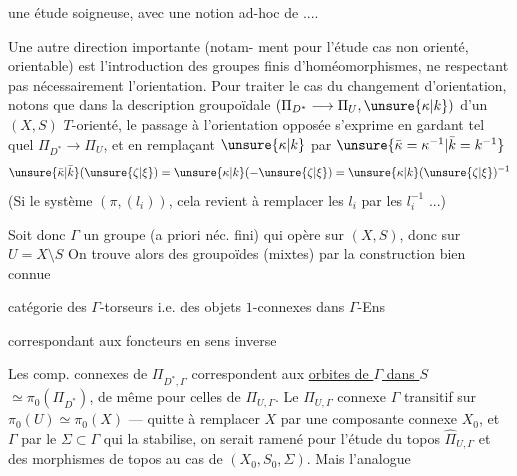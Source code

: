 une étude soigneuse, avec une notion
ad-hoc de  ....

Une autre direction importante (notam-
ment pour l'étude  cas non orienté,
 orientable) est l'introduction des
groupes finis d'homéomorphismes, ne
respectant pas nécessairement l'orientation.
Pour traiter le cas du changement d'orientation,
notons que dans la description groupoïdale
$(\Pi_{D^*}\longrightarrow\Pi_U,\unsure{\kappa|k})$ d'un $(X,S)$ $T$-orienté,
le passage à l'orientation opposée s'exprime en
gardant tel quel $\Pi_{D^*}\longrightarrow\Pi_U$, et en
remplaçant $\unsure{\kappa|k}$ par $\unsure{\bar\kappa=\kappa^{-1}|\bar k=k^{-1}}$
\[
\unsure{\bar\kappa|\bar k}(\unsure{\zeta|\xi})=\unsure{\kappa|k}(-\unsure{\zeta|\xi})=\unsure{\kappa|k}(\unsure{\zeta|\xi})^{-1}
\]
(Si  le système $(\pi,(l_i))$, cela revient à
remplacer les $l_i$ par les $l_i^{-1}$ ...)

Soit donc $\Gamma$ un groupe (a priori
 néc. fini) qui opère sur $(X,S)$, donc
sur $U=X\setminus S$  On trouve alors des
groupoïdes  (mixtes)  par la construction bien connue

catégorie des $\Gamma$-torseurs
i.e. des objets $1$-connexes
dans $\Gamma$-Ens

correspondant aux foncteurs en sens inverse


Les comp. connexes de $\Pi_{D^*,\Gamma}$ correspondent
aux \uline{orbites de $\Gamma$ dans $S$}  $\simeq\pi_0(\Pi_{D^*})$,
de même pour celles de $\Pi_{U,\Gamma}$. Le 
$\Pi_{U,\Gamma}$ connexe 
 $\Gamma$ transitif
sur $\pi_0(U)\simeq\pi_0(X)$ --- quitte à remplacer
$X$ par une composante connexe $X_0$, et $\Gamma$
par le  $\Sigma\subset\Gamma$ qui la stabilise,
on serait ramené pour l'étude du
topos $\widehat\Pi_{U,\Gamma}$ et des morphismes de topos
au cas de $(X_0,S_0,\Sigma)$. Mais l'analogue

